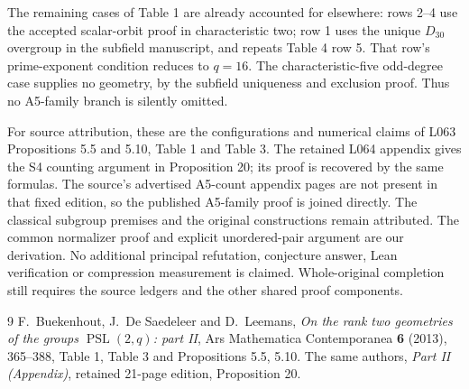 \documentclass[11pt]{article}
\newcommand{\PSL}{\operatorname{PSL}}\newcommand{\PGL}{\operatorname{PGL}}\newcommand{\N}{\operatorname{N}}
\begin{document}
The remaining cases of Table 1 are already accounted for elsewhere:
rows 2--4 use the accepted scalar-orbit proof in characteristic two;
row 1 uses the unique $D_{30}$ overgroup in the subfield manuscript,
and repeats Table 4 row 5. That row's prime-exponent condition
reduces to $q=16$. The characteristic-five odd-degree case supplies
no geometry, by the subfield uniqueness and exclusion proof. Thus
no A5-family branch is silently omitted.

For source attribution, these are the configurations and numerical
claims of L063 Propositions 5.5 and 5.10, Table 1 and Table 3.
The retained L064 appendix gives the S4 counting argument in
Proposition 20; its proof is recovered by the same formulas. The
source's advertised A5-count appendix pages are not present in that
fixed edition, so the published A5-family proof is joined directly.
The classical subgroup premises and the original constructions remain
attributed. The common normalizer proof and explicit unordered-pair
argument are our derivation. No additional principal refutation,
conjecture answer, Lean verification or compression measurement is
claimed. Whole-original completion still requires the source ledgers
and the other shared proof components.
\begin{thebibliography}{9}
 F.~Buekenhout, J.~De Saedeleer and D.~Leemans,
\emph{On the rank two geometries of the groups $\PSL(2,q)$: part II},
Ars Mathematica Contemporanea \textbf{6} (2013), 365--388,
Table 1, Table 3 and Propositions 5.5, 5.10.
 The same authors, \emph{Part II (Appendix)},
retained 21-page edition, Proposition 20.
\end{thebibliography}
\end{document}
